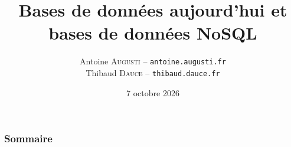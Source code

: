 \documentclass[handout]{beamer}
\title{
	Bases de données aujourd'hui et bases de données NoSQL
}
\author{
	Antoine \textsc{Augusti} -- \texttt{antoine.augusti.fr} \\
	\vspace{5px}
	Thibaud \textsc{Dauce} -- \texttt{thibaud.dauce.fr}
}
\date{7 octobre 2026}
\begin{document}
	\begin{frame}[plain]
		\titlepage
	\end{frame}

	\begin{frame}[plain]
		\frametitle{Sommaire}
		\tableofcontents[hidesubsections]
	\end{frame}

		

		

		

		

		
\end{document}

